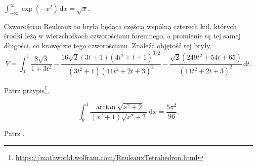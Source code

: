 
\begin{problem}
    $\int_{-\infty}^\infty \exp(-x^2) \,\mathrm{d}x = \sqrt x$.
\end{problem}

\begin{problem}
    \label{reuleaux_tetrahedron}%
    Czworościan Reuleaux to bryła będąca częścią wspólną czterech kul, których środki leżą w wierzchołkach czworościanu foremnego, a promienie są tej samej długości, co krawędzie tego czworościanu.
    Znaleźć objętość tej bryły,
    \begin{equation}
        V = \int_0^1
        \frac{
            8\sqrt{3}
        }{
            1 + 3t^2
        } - \frac{
            16 \sqrt{2} (3t+1) (4t^2 +t+1)^{3/2}
        }{
            (3t^2+1)(11t^2 + 2t + 3)^2
        } - \frac{
            \sqrt{2} (249 t^2 + 54t + 65)
        }{
            (11t^2 + 2t +3)^2
        } \,\mathrm{d} t.
    \end{equation}
\end{problem}

\begin{solution} %
    Patrz przypis\footnote{\url{https://mathworld.wolfram.com/ReuleauxTetrahedron.html}}. %
\end{solution} %

\begin{problem}
    \label{ahmed_integral}%
    \begin{equation}
        \int_0^1 \frac{\arctan \sqrt{x^2+2}}{(x^2+1) \sqrt{x^2+2}} \,\mathrm{d}x = \frac{5\pi^2}{96}.
    \end{equation}
\end{problem}

\begin{solution} %
    Patrz \cite{ahmed02}. %
\end{solution} %


%